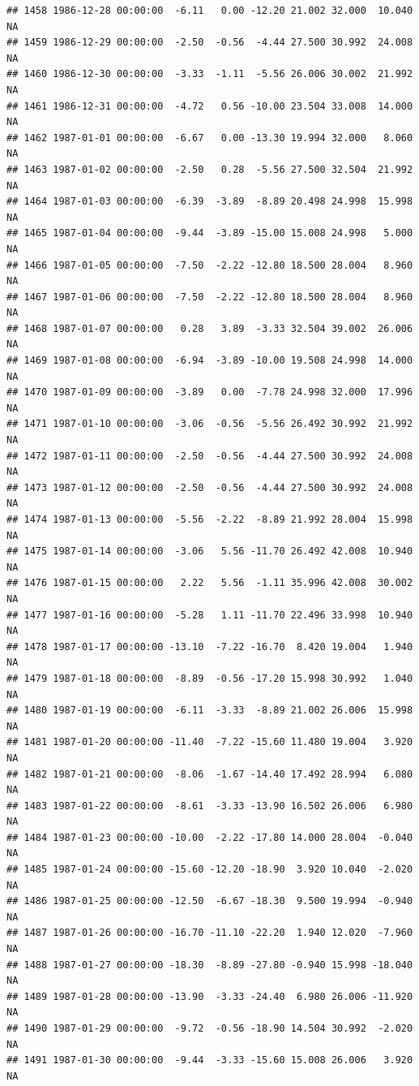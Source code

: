 \documentclass{article}\usepackage{graphicx, color}
\makeatletter
\newenvironment{kframe}{%
 \def\at@end@of@kframe{}%
 \ifinner\ifhmode%
  \def\at@end@of@kframe{\end{minipage}}%
  \begin{minipage}{\columnwidth}%
 \fi\fi%
 \def\FrameCommand##1{\hskip\@totalleftmargin \hskip-\fboxsep
 \colorbox{shadecolor}{##1}\hskip-\fboxsep
     \hskip-\linewidth \hskip-\@totalleftmargin \hskip\columnwidth}%
 \MakeFramed {\advance\hsize-\width
   \@totalleftmargin\z@ \linewidth\hsize
   \@setminipage}}%
 {\par\unskip\endMakeFramed%
 \at@end@of@kframe}
\newenvironment{knitrout}{}{} %
\makeatother
\begin{document}
\begin{knitrout}
\begin{kframe}
\begin{verbatim}
## 1458 1986-12-28 00:00:00  -6.11   0.00 -12.20 21.002 32.000  10.040     NA
## 1459 1986-12-29 00:00:00  -2.50  -0.56  -4.44 27.500 30.992  24.008     NA
## 1460 1986-12-30 00:00:00  -3.33  -1.11  -5.56 26.006 30.002  21.992     NA
## 1461 1986-12-31 00:00:00  -4.72   0.56 -10.00 23.504 33.008  14.000     NA
## 1462 1987-01-01 00:00:00  -6.67   0.00 -13.30 19.994 32.000   8.060     NA
## 1463 1987-01-02 00:00:00  -2.50   0.28  -5.56 27.500 32.504  21.992     NA
## 1464 1987-01-03 00:00:00  -6.39  -3.89  -8.89 20.498 24.998  15.998     NA
## 1465 1987-01-04 00:00:00  -9.44  -3.89 -15.00 15.008 24.998   5.000     NA
## 1466 1987-01-05 00:00:00  -7.50  -2.22 -12.80 18.500 28.004   8.960     NA
## 1467 1987-01-06 00:00:00  -7.50  -2.22 -12.80 18.500 28.004   8.960     NA
## 1468 1987-01-07 00:00:00   0.28   3.89  -3.33 32.504 39.002  26.006     NA
## 1469 1987-01-08 00:00:00  -6.94  -3.89 -10.00 19.508 24.998  14.000     NA
## 1470 1987-01-09 00:00:00  -3.89   0.00  -7.78 24.998 32.000  17.996     NA
## 1471 1987-01-10 00:00:00  -3.06  -0.56  -5.56 26.492 30.992  21.992     NA
## 1472 1987-01-11 00:00:00  -2.50  -0.56  -4.44 27.500 30.992  24.008     NA
## 1473 1987-01-12 00:00:00  -2.50  -0.56  -4.44 27.500 30.992  24.008     NA
## 1474 1987-01-13 00:00:00  -5.56  -2.22  -8.89 21.992 28.004  15.998     NA
## 1475 1987-01-14 00:00:00  -3.06   5.56 -11.70 26.492 42.008  10.940     NA
## 1476 1987-01-15 00:00:00   2.22   5.56  -1.11 35.996 42.008  30.002     NA
## 1477 1987-01-16 00:00:00  -5.28   1.11 -11.70 22.496 33.998  10.940     NA
## 1478 1987-01-17 00:00:00 -13.10  -7.22 -16.70  8.420 19.004   1.940     NA
## 1479 1987-01-18 00:00:00  -8.89  -0.56 -17.20 15.998 30.992   1.040     NA
## 1480 1987-01-19 00:00:00  -6.11  -3.33  -8.89 21.002 26.006  15.998     NA
## 1481 1987-01-20 00:00:00 -11.40  -7.22 -15.60 11.480 19.004   3.920     NA
## 1482 1987-01-21 00:00:00  -8.06  -1.67 -14.40 17.492 28.994   6.080     NA
## 1483 1987-01-22 00:00:00  -8.61  -3.33 -13.90 16.502 26.006   6.980     NA
## 1484 1987-01-23 00:00:00 -10.00  -2.22 -17.80 14.000 28.004  -0.040     NA
## 1485 1987-01-24 00:00:00 -15.60 -12.20 -18.90  3.920 10.040  -2.020     NA
## 1486 1987-01-25 00:00:00 -12.50  -6.67 -18.30  9.500 19.994  -0.940     NA
## 1487 1987-01-26 00:00:00 -16.70 -11.10 -22.20  1.940 12.020  -7.960     NA
## 1488 1987-01-27 00:00:00 -18.30  -8.89 -27.80 -0.940 15.998 -18.040     NA
## 1489 1987-01-28 00:00:00 -13.90  -3.33 -24.40  6.980 26.006 -11.920     NA
## 1490 1987-01-29 00:00:00  -9.72  -0.56 -18.90 14.504 30.992  -2.020     NA
## 1491 1987-01-30 00:00:00  -9.44  -3.33 -15.60 15.008 26.006   3.920     NA

\end{verbatim}
\end{kframe}
\end{knitrout}
\end{document}
